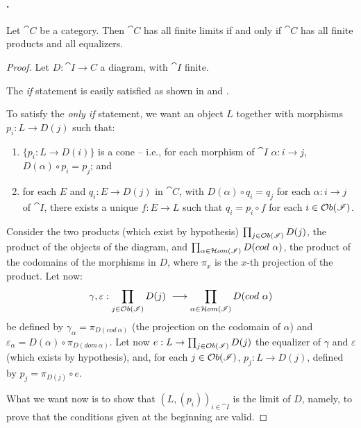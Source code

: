\documentclass[a4paper, twoside,openright]{report}
\theoremstyle{plain}
\theoremstyle{definition}
\begin{document}
\paragraph{.}
 Let $\cat C$ be a category. Then $\cat C$ has all finite limits if and only if $\cat C$ has all finite products and all equalizers.
\begin{proof}
    Let $D: \cat{I \rightarrow C}$ a diagram, with $\cat I$ finite.
    
    The \emph{if} statement is easily satisfied as shown in  and .

    To satisfy the \emph{only if} statement, we want an object $L$ together with morphisms $p_i : L \rightarrow D(j)$ such that:
    \begin{enumerate}
        \item\label{item:cone} $\{p_i: L \rightarrow D(i)\}$ is a cone -- i.e., for each morphism of $\cat I$ $\alpha : i \rightarrow j$, $D(\alpha) \circ p_i = p_j$; and
        \item\label{item:univ_prop} for each $E$ and $q_i : E \rightarrow D(j)$ in $\cat C$, with $D(\alpha) \circ q_i = q_j$ for each $\alpha : i \rightarrow j$ of $\cat I$, there exists a unique $f: E \rightarrow L$ such that $q_i = p_i \circ f$ for each $i \in \mathcal{O}b(\mathscr{I})$.
    \end{enumerate}

    Consider the two products (which exist by hypothesis) $\prod_{j \in \mathcal{O}b(\mathscr{I})} D(j)$, the product of the objects of the diagram, and $\prod_{\alpha \in \Hom(\cat I)}D(cod \ \alpha)$, the product of the codomains of the morphisms in $D$, where $\pi_x$ is the $x$-th projection of the product.
    Let now:
    \[
        \gamma, \varepsilon : \prod_{j \in \mathcal{O}b(\mathscr{I})}D(j) \ \longrightarrow \prod_{\alpha \in \mathcal{H}om(\mathscr{I})} D(cod \ \alpha)
    \]
    be defined by $\gamma_\alpha = \pi_{D(cod\ \alpha)}$ (the projection on the codomain of $\alpha$) and $\varepsilon_\alpha = D(\alpha) \circ \pi_{D(dom \ \alpha)}$.
    Let now $e: L \rightarrow \prod_{j \in \mathcal{O}b(\mathscr{I})}D(j)$ the equalizer of $\gamma$ and $\varepsilon$ (which exists by hypothesis), and, for each $j \in \mathcal{O}b(\mathscr{I})$, $p_j: L \rightarrow D(j)$, defined by $p_j = \pi_{D(j)} \circ e$.
    
    What we want now is to show that $(L, (p_i))_{i \in \cat I}$ is the limit of $D$, namely, to prove that the conditions given at the beginning are valid.


\end{proof}
\end{document}
